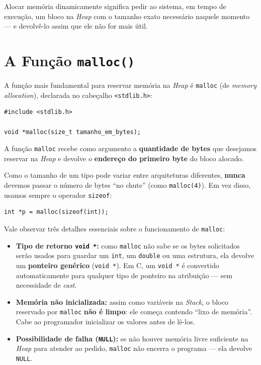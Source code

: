 Alocar memória dinamicamente significa pedir ao sistema, em tempo de execução, um bloco na \textit{Heap} com o tamanho exato necessário naquele momento — e devolvê-lo assim que ele não for mais útil.

\section{A Função \texttt{malloc()}}
\label{sec:funcao-malloc}

A função mais fundamental para reservar memória na \textit{Heap} é \texttt{malloc} (de \textit{memory allocation}), declarada no cabeçalho \texttt{<stdlib.h>}:

\begin{lstlisting}
#include <stdlib.h>

void *malloc(size_t tamanho_em_bytes);
\end{lstlisting}

A função \texttt{malloc} recebe como argumento a \textbf{quantidade de bytes} que desejamos reservar na \textit{Heap} e devolve o \textbf{endereço do primeiro byte} do bloco alocado.

Como o tamanho de um tipo pode variar entre arquiteturas diferentes, \textbf{nunca} devemos passar o número de bytes ``no chute'' (como \texttt{malloc(4)}). Em vez disso, usamos sempre o operador \texttt{sizeof}:

\begin{lstlisting}
int *p = malloc(sizeof(int));
\end{lstlisting}

Vale observar três detalhes essenciais sobre o funcionamento de \texttt{malloc}:

\begin{itemize}
    \item \textbf{Tipo de retorno \texttt{void *}:} como \texttt{malloc} não sabe se os bytes solicitados serão usados para guardar um \texttt{int}, um \texttt{double} ou uma estrutura, ela devolve um \textbf{ponteiro genérico} (\texttt{void *}). Em C, um \texttt{void *} é convertido automaticamente para qualquer tipo de ponteiro na atribuição — sem necessidade de \textit{cast}.
    \item \textbf{Memória não inicializada:} assim como variáveis na \textit{Stack}, o bloco reservado por \texttt{malloc} \textbf{não é limpo}: ele começa contendo ``lixo de memória''. Cabe ao programador inicializar os valores antes de lê-los.
    \item \textbf{Possibilidade de falha (\texttt{NULL}):} se não houver memória livre suficiente na \textit{Heap} para atender ao pedido, \texttt{malloc} não encerra o programa — ela devolve \texttt{NULL}.
\end{itemize}

